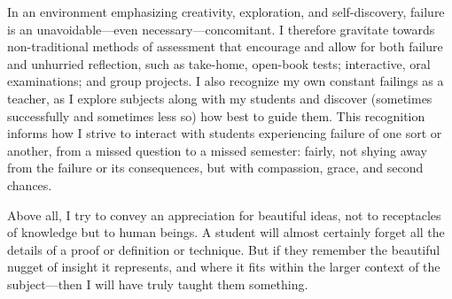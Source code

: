 \documentclass{article}
\begin{document}
In an environment emphasizing creativity, exploration, and
self-discovery, failure is an unavoidable---even
necessary---concomitant.  I therefore gravitate towards
non-traditional methods of assessment that encourage and allow for
both failure and unhurried reflection, such as take-home, open-book
tests; interactive, oral examinations; and group projects.  I also
recognize my own constant failings as a teacher, as I explore subjects
along with my students and discover (sometimes successfully and
sometimes less so) how best to guide them.  This recognition informs
how I strive to interact with students experiencing failure of one
sort or another, from a missed question to a missed semester: fairly,
not shying away from the failure or its consequences, but with
compassion, grace, and second chances.

Above all, I try to convey an appreciation for beautiful ideas,
not to receptacles of knowledge but to human beings. A student will
almost certainly forget all the details of a proof or definition or
technique.  But if they remember the beautiful nugget of insight it
represents, and where it fits within the larger context of the
subject---then I will have truly taught them something.

% 
\end{document}
